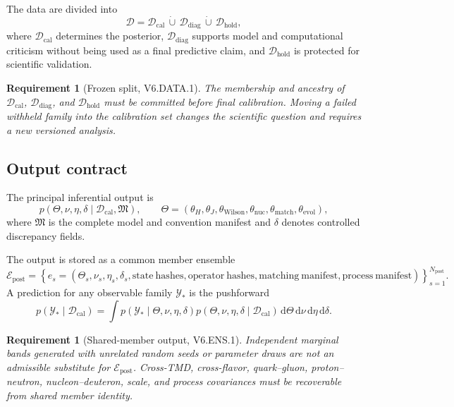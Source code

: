 \documentclass[11pt]{article}
\newtheorem{requirement}[definition]{Requirement}
\newcommand{\dd}{\mathrm{d}}
\newcommand{\cY}{\mathcal Y}
\newcommand{\caldata}{\mathcal D_{\mathrm{cal}}}
\newcommand{\diagdata}{\mathcal D_{\mathrm{diag}}}
\newcommand{\holddata}{\mathcal D_{\mathrm{hold}}}
\newcommand{\allData}{\mathcal D}
\newcommand{\post}{\mathrm{post}}
\newcommand{\matchp}{\mathrm{match}}
\newcommand{\evol}{\mathrm{evol}}
\newcommand{\wil}{\mathrm{Wilson}}
\newcommand{\nuc}{\mathrm{nuc}}
\begin{document}
The data are divided into
\begin{equation}
 \allData
 =
 \caldata
 \,\dot\cup\,
 \diagdata
 \,\dot\cup\,
 \holddata,
 \label{eq:data-partition}
\end{equation}
where \(\caldata\) determines the posterior, \(\diagdata\) supports model and
computational criticism without being used as a final predictive claim, and
\(\holddata\) is protected for scientific validation.

\begin{requirement}[Frozen split, V6.DATA.1]
The membership and ancestry of \(\caldata\), \(\diagdata\), and \(\holddata\)
must be committed before final calibration.  Moving a failed withheld family
into the calibration set changes the scientific question and requires a new
versioned analysis.
\end{requirement}

\subsection{Output contract}

The principal inferential output is
\begin{equation}
 p(\Theta,\nu,\eta,\delta\mid\caldata,\mathfrak M),
 \qquad
 \Theta=
 \left(
 \theta_H,\theta_J,\theta_{\wil},\theta_{\nuc},
 \theta_{\matchp},\theta_{\evol}
 \right),
 \label{eq:full-posterior}
\end{equation}
where \(\mathfrak M\) is the complete model and convention manifest and
\(\delta\) denotes controlled discrepancy fields.

The output is stored as a common member ensemble
\begin{equation}
 \mathcal E_{\post}
 =
 \left\{
 e_s=
 \left(
 \Theta_s,\nu_s,\eta_s,\delta_s,
 \mathrm{state\ hashes},
 \mathrm{operator\ hashes},
 \mathrm{matching\ manifest},
 \mathrm{process\ manifest}
 \right)
 \right\}_{s=1}^{N_{\post}}.
 \label{eq:posterior-ensemble}
\end{equation}
A prediction for any observable family \(\cY_*\) is the pushforward
\begin{equation}
 p(\cY_*\mid\caldata)
 =
 \int
 p(\cY_*\mid\Theta,\nu,\eta,\delta)
 p(\Theta,\nu,\eta,\delta\mid\caldata)
 \,\dd\Theta\,\dd\nu\,\dd\eta\,\dd\delta .
 \label{eq:posterior-predictive}
\end{equation}

\begin{requirement}[Shared-member output, V6.ENS.1]
Independent marginal bands generated with unrelated random seeds or parameter
draws are not an admissible substitute for \(\mathcal E_{\post}\).  Cross-TMD,
cross-flavor, quark--gluon, proton--neutron, nucleon--deuteron, scale, and
process covariances must be recoverable from shared member identity.
\end{requirement}
\end{document}
